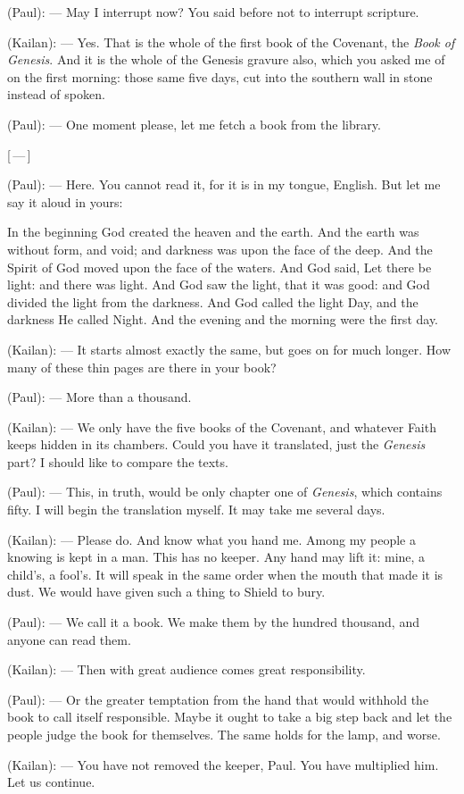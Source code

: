 \begin{room}

(Paul): --- May I interrupt now? You said before not to interrupt scripture.

(Kailan): --- Yes. That is the whole of the first book of the Covenant, the \textit{Book of Genesis}. And it is the whole of the Genesis gravure also, which you asked me of on the first morning: those same five days, cut into the southern wall in stone instead of spoken.

(Paul): --- One moment please, let me fetch a book from the library.

\centerline{[\,---\,]}

(Paul): --- Here. You cannot read it, for it is in my tongue, English. But let me say it aloud in yours:

\begin{scripture}

In the beginning God created the heaven and the earth. And the earth was without form, and void; and darkness was upon the face of the deep. And the Spirit of God moved upon the face of the waters. And God said, Let there be light: and there was light. And God saw the light, that it was good: and God divided the light from the darkness. And God called the light Day, and the darkness He called Night. And the evening and the morning were the first day.

\end{scripture}

(Kailan): --- It starts almost exactly the same, but goes on for much longer. How many of these thin pages are there in your book? 

(Paul): --- More than a thousand.

(Kailan): --- We only have the five books of the Covenant, and whatever Faith keeps hidden in its chambers. Could you have it translated, just the \textit{Genesis} part? I should like to compare the texts.

(Paul): --- This, in truth, would be only chapter one of \textit{Genesis}, which contains fifty. I will begin the translation myself. It may take me several days.

(Kailan): --- Please do. And know what you hand me. Among my people a knowing is kept in a man. This has no keeper. Any hand may lift it: mine, a child's, a fool's. It will speak in the same order when the mouth that made it is dust. We would have given such a thing to Shield to bury.

(Paul): --- We call it a book. We make them by the hundred thousand, and anyone can read them.

(Kailan): --- Then with great audience comes great responsibility.

(Paul): --- Or the greater temptation from the hand that would withhold the book to call itself responsible. Maybe it ought to take a big step back and let the people judge the book for themselves. The same holds for the lamp, and worse.

(Kailan): --- You have not removed the keeper, Paul. You have multiplied him. Let us continue.

\end{room}

